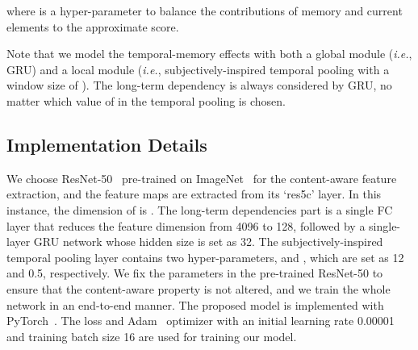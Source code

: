 \documentclass[sigconf]{acmart}
\begin{document}
where  is a hyper-parameter to balance the contributions of memory and current elements to the approximate score.

Note that we model the temporal-memory effects with both a global module (\textit{i.e.}, GRU) and a local module  (\textit{i.e.}, subjectively-inspired temporal pooling with a window size of ). The long-term dependency is always considered by GRU, no matter which value of  in the temporal pooling is chosen. 


\subsection{Implementation Details}
We choose ResNet-50~\cite{he2016deep} pre-trained on ImageNet~\cite{deng2009imagenet} for the content-aware feature extraction, and the feature maps are extracted from its `res5c' layer. In this instance, the dimension of  is .
The long-term dependencies part is a single FC layer that reduces the feature dimension from 4096 to 128, followed by a single-layer GRU network whose hidden size is set as 32. 
The subjectively-inspired temporal pooling layer contains two hyper-parameters,  and , which are set as 12 and 0.5, respectively. 
We fix the parameters in the pre-trained ResNet-50 to ensure that the content-aware property is not altered, and we train the whole network in an end-to-end manner. 
The proposed model is implemented with PyTorch~\cite{paszke2017automatic}. The  loss and Adam~\cite{kingma2014adam} optimizer with an initial learning rate 0.00001 and training batch size 16 are used for training our model.
\end{document}
